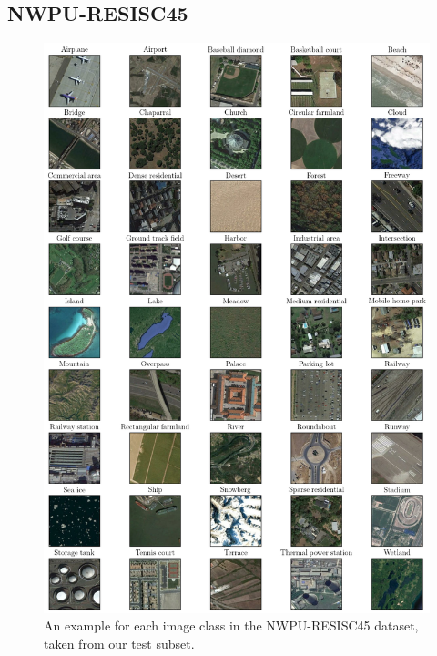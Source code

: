 \begin{appendices}
\section{NWPU-RESISC45}
\begin{figure}[h]
    \centering
    \includegraphics[width=\linewidth]{./assets/resisc45_all_classes.png}
    \caption{An example for each image class in the NWPU-RESISC45 dataset, taken from our test subset.}
\end{figure}

%
%



\end{appendices}
